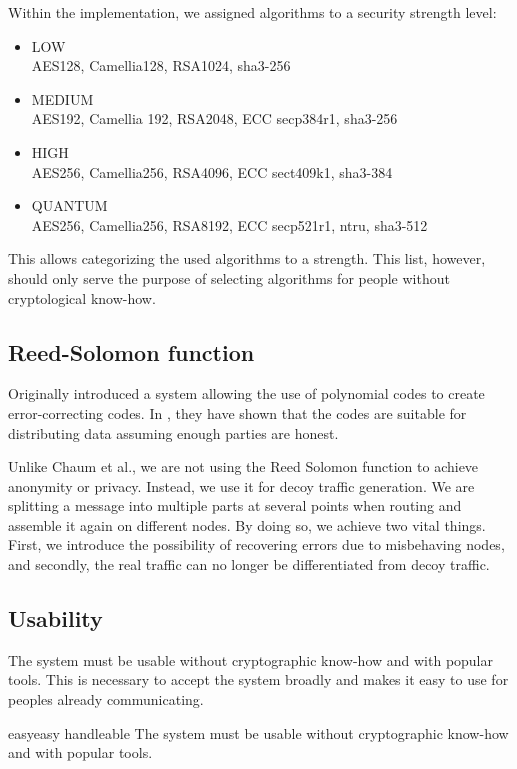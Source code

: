 Within the implementation, we assigned algorithms to a security strength level:
\begin{itemize}
	\item LOW\\
	AES128, Camellia128, RSA1024, sha3-256
	\item MEDIUM\\
	AES192, Camellia 192, RSA2048, ECC secp384r1, sha3-256
	\item HIGH\\
	AES256, Camellia256, RSA4096, ECC sect409k1, sha3-384
	\item QUANTUM\\
	AES256, Camellia256, RSA8192, ECC secp521r1, ntru, sha3-512
\end{itemize}

This allows categorizing the used algorithms to a strength. This list, however, should only serve the purpose of selecting algorithms for people without cryptological know-how.

\subsection{Reed-Solomon function}
Originally \cite{reed1960polynomial} introduced a system allowing the use of polynomial codes to create error-correcting codes. In \cite{chaum1988multiparty} \citeauthor{chaum1988multiparty}, they have shown that the codes are suitable for distributing data assuming enough parties are honest.

Unlike Chaum et al., we are not using the Reed Solomon function to achieve anonymity or privacy. Instead, we use it for decoy traffic generation. We are splitting a message into multiple parts at several points when routing and assemble it again on different nodes. By doing so, we achieve two vital things. First, we introduce the possibility of recovering errors due to misbehaving nodes, and secondly, the real traffic can no longer be differentiated from decoy traffic. 

\subsection{Usability}
The system must be usable without cryptographic know-how and with popular tools. This is necessary to accept the system broadly and makes it easy to use for peoples already communicating.

\begin{requirement}{easy}{easy handleable}
	The system must be usable without cryptographic know-how and with popular tools.
\end{requirement}

